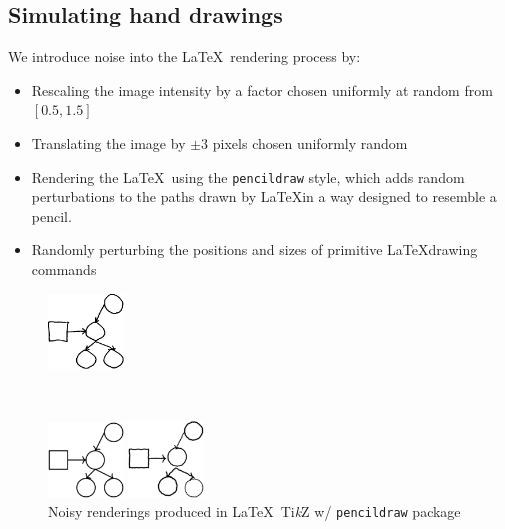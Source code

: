 \documentclass{article}
\begin{document}
\subsection{Simulating hand drawings}\label{simulatingHandDrawings}

We introduce noise into the \LaTeX~rendering process by:

\begin{itemize}
\item Rescaling the image intensity by a factor chosen uniformly at random from $[0.5,1.5]$
\item Translating the image by $\pm 3$ pixels chosen uniformly random
\item Rendering the \LaTeX~using the \verb|pencildraw| style,
  which adds random perturbations to the paths drawn by \LaTeX in a way designed to resemble a pencil.
\item Randomly perturbing the positions and sizes of primitive  \LaTeX drawing commands
\end{itemize}

\begin{figure}
  
  
\centering\vspace{-0.7cm}  \begin{minipage}[t]{2.5cm}\centering\includegraphics[width = 2cm]{figures/expert-60-reduced.png}
  \end{minipage}\\
   \begin{minipage}[t]{2.5cm}\includegraphics[width = 2cm]{figures/60-groundTruth-reduced.png}
  \end{minipage}\qquad%
  \begin{minipage}[t]{2.5cm}\includegraphics[width = 2cm]{figures/60-1-reduced.png}
  \end{minipage}%
  \caption{Noisy renderings produced in \LaTeX~Ti\emph{k}Z w/ \texttt{pencildraw} package }
    \label{handDrawingExamples} 
\end{figure}
\end{document}
